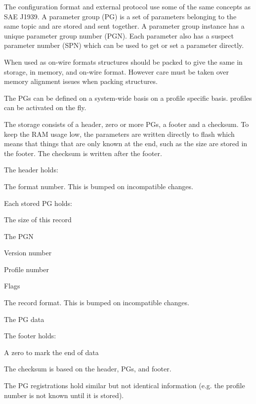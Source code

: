 The configuration format and external protocol use some of the same concepts as S\+A\+E J1939. A parameter group (P\+G) is a set of parameters belonging to the same topic and are stored and sent together. A parameter group instance has a unique parameter group number (P\+G\+N). Each parameter also has a suspect parameter number (S\+P\+N) which can be used to get or set a parameter directly.

When used as on-\/wire formats structures should be packed to give the same in storage, in memory, and on-\/wire format. However care must be taken over memory alignment issues when packing structures.

The P\+Gs can be defined on a system-\/wide basis on a profile specific basis. profiles can be activated on the fly.

The storage consists of a header, zero or more P\+Gs, a footer and a checksum. To keep the R\+A\+M usage low, the parameters are written directly to flash which means that things that are only known at the end, such as the size are stored in the footer. The checksum is written after the footer.

The header holds\+:


\begin{DoxyItemize}
\item The format number. This is bumped on incompatible changes.
\end{DoxyItemize}

Each stored P\+G holds\+:


\begin{DoxyItemize}
\item The size of this record
\item The P\+G\+N
\item Version number
\item Profile number
\item Flags
\item The record format. This is bumped on incompatible changes.
\item The P\+G data
\end{DoxyItemize}

The footer holds\+:


\begin{DoxyItemize}
\item A zero to mark the end of data
\end{DoxyItemize}

The checksum is based on the header, P\+Gs, and footer.

The P\+G registrations hold similar but not identical information (e.\+g. the profile number is not known until it is stored).

